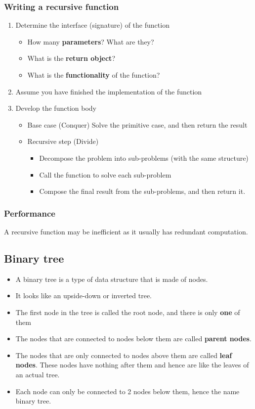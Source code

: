 \documentclass[11pt]{article}
\begin{document}
\subsubsection{Writing a recursive function}
\label{sec:org95f81ae}
\begin{enumerate}
\item Determine the interface (signature) of the function
\begin{itemize}
\item How many \textbf{parameters}? What are they?
\item What is the \textbf{return object}?
\item What is the \textbf{functionality} of the function?
\end{itemize}

\item Assume you have finished the implementation of the function
\item Develop the function body
\begin{itemize}
\item Base case (Conquer)
Solve the primitive case, and then return the result
\item Recursive step (Divide)
\begin{itemize}
\item Decompose the problem into sub-problems (with the same structure)
\item Call the function to solve each sub-problem
\item Compose the final result from the sub-problems, and then return it.
\end{itemize}
\end{itemize}
\end{enumerate}

\subsubsection{Performance}
\label{sec:org1121da7}
A recursive function may be inefficient as it usually has redundant computation.

\subsection{Binary tree}
\label{sec:orgf0c20e5}
\begin{itemize}
\item A binary tree is a type of data structure that is made of nodes.
\item It looks like an upside-down or inverted tree.
\item The first node in the tree is called the root node, and there is only \textbf{one} of them
\item The nodes that are connected to nodes below them are called \textbf{parent nodes}.
\item The nodes that are only connected to nodes above them are called \textbf{leaf nodes}. These nodes have nothing after them and hence are like the leaves of an actual tree.
\item Each node can only be connected to 2 nodes below them, hence the name binary tree.
\end{itemize}
\end{document}
